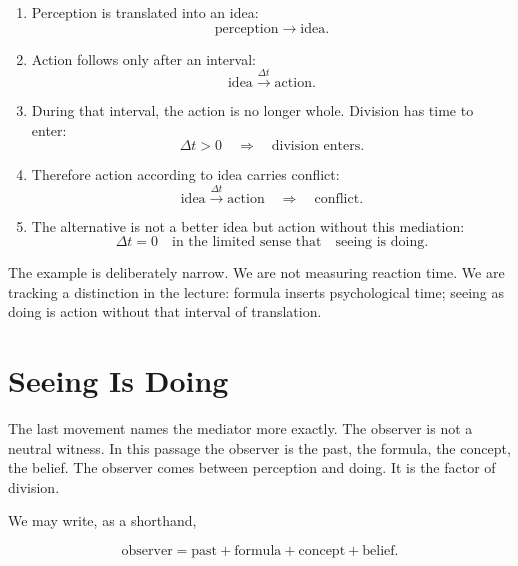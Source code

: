 \begin{enumerate}
\item Perception is translated into an idea:
\begin{equation}
\text{perception}
\longrightarrow
\text{idea}.
\end{equation}

\item Action follows only after an interval:
\begin{equation}
\text{idea}
\xrightarrow{\Delta t}
\text{action}.
\end{equation}

\item During that interval, the action is no longer whole. Division has time to enter:
\begin{equation}
\Delta t > 0
\quad\Rightarrow\quad
\text{division enters}.
\end{equation}

\item Therefore action according to idea carries conflict:
\begin{equation}
\text{idea}
\xrightarrow{\Delta t}
\text{action}
\quad\Rightarrow\quad
\text{conflict}.
\end{equation}

\item The alternative is not a better idea but action without this mediation:
\begin{equation}
\Delta t = 0
\quad\text{in the limited sense that}\quad
\text{seeing is doing}.
\end{equation}
\end{enumerate}

The example is deliberately narrow. We are not measuring reaction time. We are tracking a distinction in the lecture: formula inserts psychological time; seeing as doing is action without that interval of translation.

\section{Seeing Is Doing}

The last movement names the mediator more exactly. The observer is not a neutral witness. In this passage the observer is the past, the formula, the concept, the belief. The observer comes between perception and doing. It is the factor of division.

We may write, as a shorthand,

\begin{equation}
\text{observer}
=
\text{past}
+
\text{formula}
+
\text{concept}
+
\text{belief}.
\end{equation}

